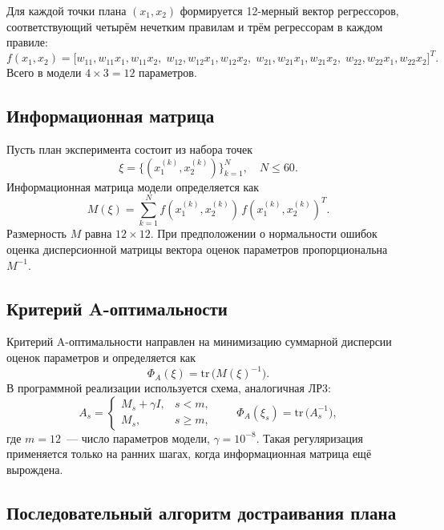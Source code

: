 \documentclass[a4paper,12pt]{article}
\begin{document}
Для каждой точки плана $(x_1,x_2)$ формируется 12-мерный вектор
регрессоров, соответствующий четырём нечетким правилам и трём
регрессорам в каждом правиле:
\begin{equation}
f(x_1,x_2) =
\bigl[
w_{11}, w_{11}x_1, w_{11}x_2,\;
w_{12}, w_{12}x_1, w_{12}x_2,\;
w_{21}, w_{21}x_1, w_{21}x_2,\;
w_{22}, w_{22}x_1, w_{22}x_2
\bigr]^T.
\end{equation}
Всего в модели $4 \times 3 = 12$ параметров.

\subsection{Информационная матрица}

Пусть план эксперимента состоит из набора точек
\[
\xi = \{(x_1^{(k)}, x_2^{(k)})\}_{k=1}^N,
\quad N \le 60.
\]
Информационная матрица модели определяется как
\begin{equation}
M(\xi) = \sum_{k=1}^{N}
f(x_1^{(k)}, x_2^{(k)})\,
f(x_1^{(k)}, x_2^{(k)})^T.
\end{equation}
Размерность $M$ равна $12\times 12$.
При предположении о нормальности ошибок
оценка дисперсионной матрицы вектора оценок параметров
пропорциональна $M^{-1}$.

\subsection{Критерий A-оптимальности}

Критерий A-оптимальности направлен на минимизацию суммарной дисперсии
оценок параметров и определяется как
\begin{equation}
\Phi_A(\xi) = \mathrm{tr}\,\bigl( M(\xi)^{-1} \bigr).
\end{equation}
В программной реализации используется схема, аналогичная ЛР3:
\begin{equation}
A_s =
\begin{cases}
M_s + \gamma I, & s < m,\\
M_s, & s \ge m,
\end{cases}
\qquad
\Phi_A(\xi_s)=\mathrm{tr}\,\bigl(A_s^{-1}\bigr),
\end{equation}
где $m=12$~--- число параметров модели, $\gamma=10^{-8}$.
Такая регуляризация применяется только на ранних шагах, когда
информационная матрица ещё вырождена.

\subsection{Последовательный алгоритм достраивания плана}
\end{document}
